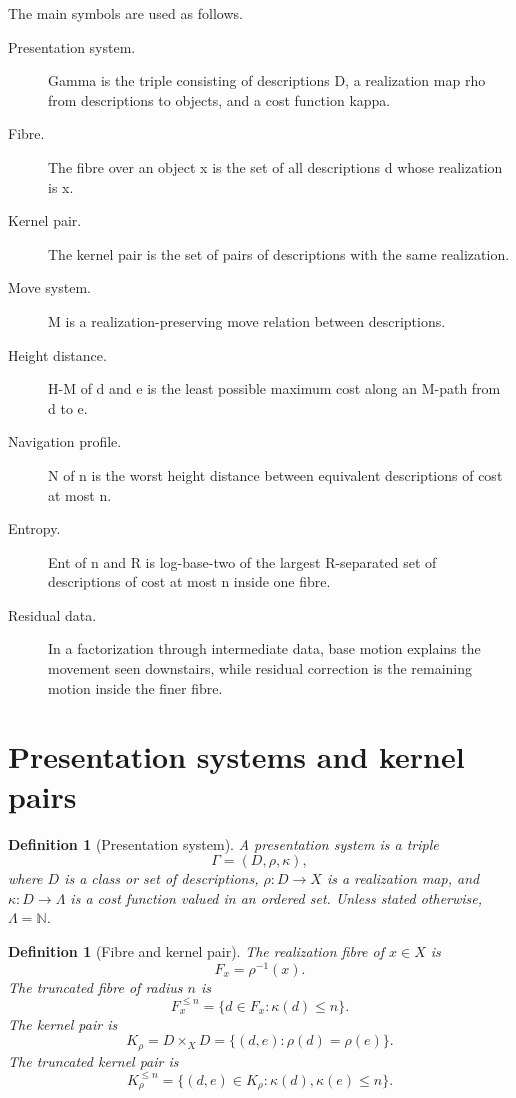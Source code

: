 \documentclass[11pt]{article}
\newtheorem{definition}[theorem]{Definition}
\begin{document}
The main symbols are used as follows.
\begin{description}
\item[Presentation system.] Gamma is the triple consisting of descriptions D, a realization map rho from descriptions to objects, and a cost function kappa.
\item[Fibre.] The fibre over an object x is the set of all descriptions d whose realization is x.
\item[Kernel pair.] The kernel pair is the set of pairs of descriptions with the same realization.
\item[Move system.] M is a realization-preserving move relation between descriptions.
\item[Height distance.] H-M of d and e is the least possible maximum cost along an M-path from d to e.
\item[Navigation profile.] N of n is the worst height distance between equivalent descriptions of cost at most n.
\item[Entropy.] Ent of n and R is log-base-two of the largest R-separated set of descriptions of cost at most n inside one fibre.
\item[Residual data.] In a factorization through intermediate data, base motion explains the movement seen downstairs, while residual correction is the remaining motion inside the finer fibre.
\end{description}

\section{Presentation systems and kernel pairs}

\begin{definition}[Presentation system]
A presentation system is a triple
\[
\Gamma=(D,\rho,\kappa),
\]
where \(D\) is a class or set of descriptions, \(\rho:D\to X\) is a realization map, and \(\kappa:D\to\Lambda\) is a cost function valued in an ordered set.  Unless stated otherwise, \(\Lambda=\mathbb N\).
\end{definition}

\begin{definition}[Fibre and kernel pair]
The realization fibre of \(x\in X\) is
\[
F_x=\rho^{-1}(x).
\]
The truncated fibre of radius \(n\) is
\[
F_x^{\le n}=\{d\in F_x:\kappa(d)\le n\}.
\]
The kernel pair is
\[
K_\rho=D\times_XD=\{(d,e):\rho(d)=\rho(e)\}.
\]
The truncated kernel pair is
\[
K_\rho^{\le n}=\{(d,e)\in K_\rho:\kappa(d),\kappa(e)\le n\}.
\]
\end{definition}
\end{document}
